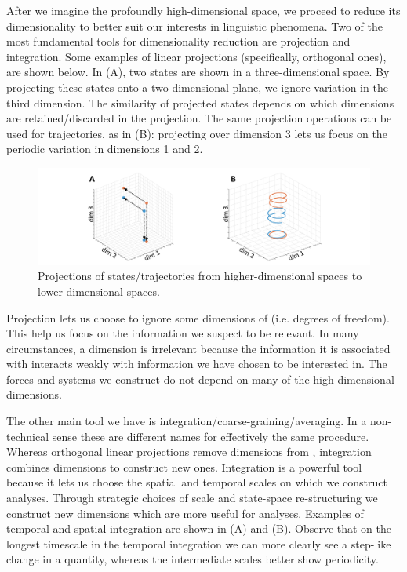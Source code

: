   After we imagine the profoundly high-di\-men\-sional space, we proceed to reduce its dimensionality to better suit our interests in linguistic phenomena. Two of the most fundamental tools for dimensionality reduction are projection and integration. Some examples of linear projections (specifically, orthogonal ones), are shown below. In {}(A), two states are shown in a three-di\-men\-sional space. By projecting these states onto a two-di\-men\-sional plane, we ignore variation in the third dimension. The similarity of projected states depends on which dimensions are retained/discarded in the projection. The same projection operations can be used for trajectories, as in {}(B): projecting over dimension 3 lets us focus on the periodic variation in dimensions 1 and 2.

  
\begin{figure}
\includegraphics[width=\textwidth]{figures/Tilsen-img170.png}
\caption{Projections of states/trajectories from higher-dimensional spaces to lower-dimensional spaces.}
\label{fig:8:4}
\end{figure}
 

  Projection lets us choose to ignore some dimensions of  (i.e. degrees of freedom). This help us focus on the information we suspect to be relevant. In many circumstances, a dimension is irrelevant because the information it is associated with interacts weakly with information we have chosen to be interested in. The forces and systems we construct do not depend on many of the high-di\-men\-sional  dimensions. 

  The other main tool we have is integration/coarse-graining/averaging. In a non-technical sense these are different names for effectively the same procedure. Whereas orthogonal linear projections remove dimensions from , integration combines dimensions to construct new ones. Integration is a powerful tool because it lets us choose the spatial and temporal scales on which we construct analyses. Through strategic choices of scale and state-space re-structuring we construct new dimensions which are more useful for analyses. Examples of temporal and spatial integration are shown in {}(A) and (B). Observe that on the longest timescale in the temporal integration we can more clearly see a step-like change in a quantity, whereas the intermediate scales better show periodicity.

